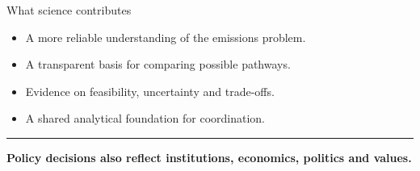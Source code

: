\documentclass[aspectratio=169,11pt]{beamer}
\begin{document}
\begin{frame}{What science contributes}
  \vspace{0.15cm}
  {\color{Ink}\fontsize{12}{15.7}\selectfont
    \begin{itemize}
      \setlength{\itemsep}{0.18cm}
      \item A more reliable understanding of the emissions problem.
      \item A transparent basis for comparing possible pathways.
      \item Evidence on feasibility, uncertainty and trade-offs.
      \item A shared analytical foundation for coordination.
    \end{itemize}
  }

  \vspace{0.3cm}
  {\color{Navy}\rule{\textwidth}{0.65pt}\par}
  \vspace{0.25cm}
  {\color{Ink}\fontsize{12.2}{16}\selectfont\bfseries
    Policy decisions also reflect institutions, economics, politics and
    values.
  \par}

  \vfill
\end{frame}
\end{document}
